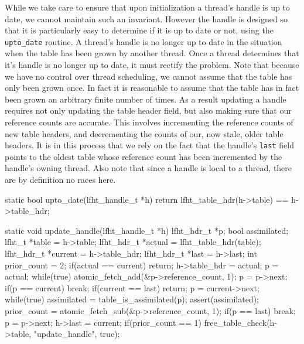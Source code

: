 While we take care to ensure that upon initialization a thread's handle is up to date,
we cannot maintain such an invariant. However the handle is designed so that it is particularly
easy to determine if it is up to date or not, using the  \texttt{upto\_date} routine.
A thread's handle is no longer up to date in the situation when the table has been grown by another thread.
Once a thread determines that it's handle is no longer up to date, it must rectify the problem.
Note that because we have no control over thread scheduling, we cannot assume that
the table has only been grown once. In fact it is reasonable to assume that the table
has in fact been grown an arbitrary finite number of times. As a result updating
a handle requires not only updating the table header field, but also making sure
that our reference counts are accurate. This involves incrementing the reference counts
of new table headers, and decrementing the counts of our, now stale, older table headers.
It is in this process that we rely on the fact that the handle's \texttt{last} field
points to the oldest table whose reference count has been incremented by the handle's owning thread.
Also note that since a handle is local to a thread, there are by definition no races here.

\begin{center}
\begin{clisting}
static bool upto_date(lfht_handle_t *h){
  return lfht_table_hdr(h->table) == h->table_hdr;
}

static void update_handle(lfht_handle_t *h){
  lfht_hdr_t *p;
  bool assimilated;
  lfht_t *table = h->table;
  lfht_hdr_t *actual = lfht_table_hdr(table);
  lfht_hdr_t *current  = h->table_hdr;
  lfht_hdr_t *last = h->last;
  int prior_count = 2;
  if(actual == current){
    return;
  }
  h->table_hdr = actual;
  p = actual;
  while(true){
    atomic_fetch_add(&p->reference_count, 1);
    p = p->next;
    if(p == current){ break; }
  }
  if(current == last){  return; }
  p = current->next;
  while(true){
    assimilated = table_is_assimilated(p);
    assert(assimilated);
    prior_count = atomic_fetch_sub(&p->reference_count, 1);
    if(p == last){ break; }
    p = p->next;
  }
  h->last = current;
  if(prior_count == 1){
    free_table_check(h->table, "update_handle", true);
  }
}
\end{clisting}
\end{center}

